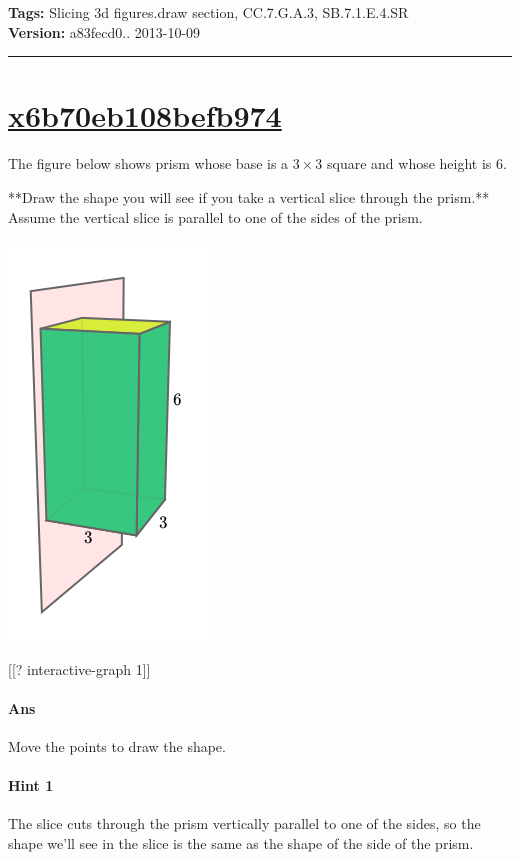 \documentclass[twocolumn,10pt]{article}
\def\shrinkfactor{0.4}
\begin{document}
\medskip
\noindent
\textbf{Tags:} {\footnotesize Slicing 3d figures.draw section, CC.7.G.A.3, SB.7.1.E.4.SR}\\
\textbf{Version:} a83fecd0.. 2013-10-09
\smallskip\hrule





\section{\href{https://www.khanacademy.org/devadmin/content/items/x6b70eb108befb974}{x6b70eb108befb974}}

\noindent
The figure below shows prism whose base is a $3\times 3$ square and whose height is $6$.   

**Draw the shape you will see if you take a vertical slice through the prism.**   
Assume the vertical slice is parallel to one of the sides of the prism.


\includegraphics[scale=\shrinkfactor]{figures/94bf14f4775048a20e633abd42558d8e108ecfab.png}

[[? interactive-graph 1]] 

\paragraph{Ans} Move the points to draw the shape. 

\paragraph{Hint 1}The slice cuts through the prism vertically parallel to one of the sides, so the shape we'll see in the slice is the same as the shape of the side of the prism.
\end{document}
